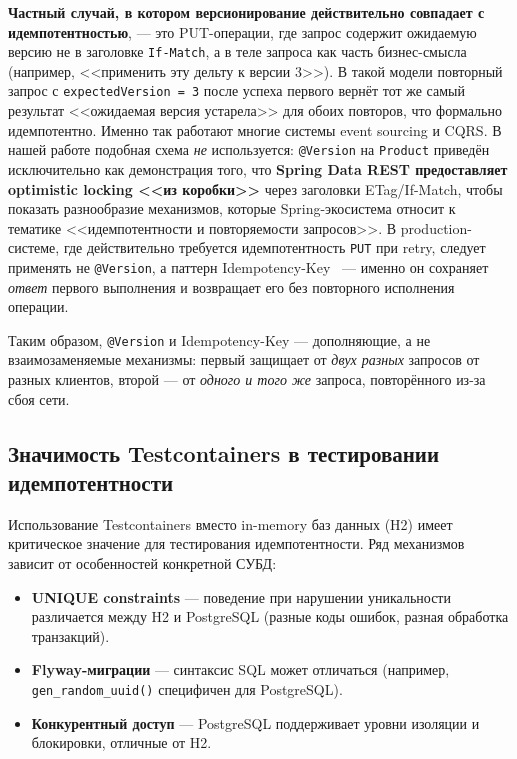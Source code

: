 \textbf{Частный случай, в котором версионирование действительно совпадает с идемпотентностью}, --- это PUT-операции, где запрос содержит ожидаемую версию не в заголовке \texttt{If-Match}, а в теле запроса как часть бизнес-смысла (например, <<применить эту дельту к версии 3>>). В такой модели повторный запрос с \texttt{expectedVersion = 3} после успеха первого вернёт тот же самый результат <<ожидаемая версия устарела>> для обоих повторов, что формально идемпотентно. Именно так работают многие системы event sourcing и CQRS. В нашей работе подобная схема \emph{не} используется: \texttt{@Version} на \texttt{Product} приведён исключительно как демонстрация того, что \textbf{Spring Data REST предоставляет optimistic locking <<из коробки>>} через заголовки ETag/If-Match, чтобы показать разнообразие механизмов, которые Spring-экосистема относит к тематике <<идемпотентности и повторяемости запросов>>. В production-системе, где действительно требуется идемпотентность \texttt{PUT} при retry, следует применять не \texttt{@Version}, а паттерн Idempotency-Key~\cite{ietf-idempotency-key, stripe-idempotency} --- именно он сохраняет \emph{ответ} первого выполнения и возвращает его без повторного исполнения операции.

Таким образом, \texttt{@Version} и Idempotency-Key --- дополняющие, а не взаимозаменяемые механизмы: первый защищает от \emph{двух разных} запросов от разных клиентов, второй --- от \emph{одного и того же} запроса, повторённого из-за сбоя сети.

\subsection{Значимость Testcontainers в тестировании идемпотентности}

Использование Testcontainers вместо in-memory баз данных (H2) имеет критическое значение для тестирования идемпотентности. Ряд механизмов зависит от особенностей конкретной СУБД:

\begin{itemize}
    \item \textbf{UNIQUE constraints} --- поведение при нарушении уникальности различается между H2 и PostgreSQL (разные коды ошибок, разная обработка транзакций).
    \item \textbf{Flyway-миграции} --- синтаксис SQL может отличаться (например, \texttt{gen\_random\_uuid()} специфичен для PostgreSQL).
    \item \textbf{Конкурентный доступ} --- PostgreSQL поддерживает уровни изоляции и блокировки, отличные от H2.
\end{itemize}

